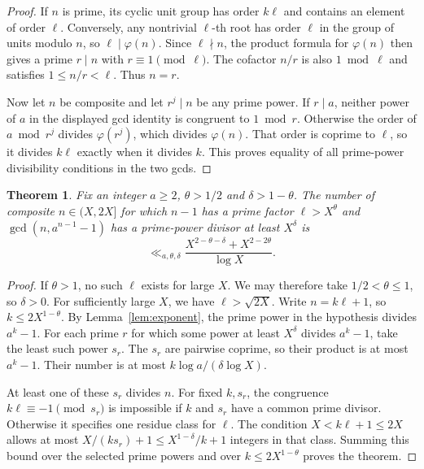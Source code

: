 \documentclass[11pt]{article}
\newtheorem{theorem}{Theorem}[section]
\begin{document}
\begin{proof}
If \(n\) is prime, its cyclic unit group has order \(k\ell\) and
contains an element of order \(\ell\). Conversely, any nontrivial
\(\ell\)-th root has order \(\ell\) in the group of units modulo
\(n\), so \(\ell\mid\varphi(n)\). Since \(\ell\nmid n\), the
product formula for \(\varphi(n)\) then gives a prime \(r\mid n\)
with \(r\equiv1\pmod\ell\). The cofactor \(n/r\) is also \(1\bmod
\ell\) and satisfies \(1\le n/r<\ell\). Thus \(n=r\).

Now let \(n\) be composite and let \(r^j\mid n\) be any prime
power. If \(r\mid a\), neither power of \(a\) in the displayed
gcd identity is congruent to \(1\bmod r\). Otherwise the order
of \(a\bmod r^j\) divides \(\varphi(r^j)\), which divides
\(\varphi(n)\). That order is coprime to \(\ell\), so it divides
\(k\ell\) exactly when it divides \(k\). This proves equality
of all prime-power divisibility conditions in the two gcds.
\end{proof}

\begin{theorem}\label{thm:joint}
Fix an integer \(a\ge2\), \(\theta>1/2\) and \(\delta>1-\theta\).
The number of composite \(n\in(X,2X]\) for which \(n-1\) has a
prime factor \(\ell>X^\theta\) and \(\gcd(n,a^{n-1}-1)\) has a
prime-power divisor at least \(X^\delta\) is
\[
  \ll_{a,\theta,\delta}
       \frac{X^{2-\theta-\delta}+X^{2-2\theta}}{\log X}.
\]
\end{theorem}

\begin{proof}
If \(\theta>1\), no such \(\ell\) exists for large \(X\). We may
therefore take \(1/2<\theta\le1\), so \(\delta>0\).
For sufficiently large \(X\), we have \(\ell>\sqrt{2X}\).
Write \(n=k\ell+1\), so \(k\le2X^{1-\theta}\). By
Lemma~\ref{lem:exponent}, the prime power in the hypothesis divides
\(a^k-1\). For each prime \(r\) for which some power at least
\(X^\delta\) divides \(a^k-1\), take the least such power \(s_r\).
The \(s_r\) are pairwise coprime, so their product is at most
\(a^k-1\). Their number is at most \(k\log a/(\delta\log X)\).

At least one of these \(s_r\) divides \(n\). For fixed \(k,s_r\),
the congruence \(k\ell\equiv-1\pmod{s_r}\) is impossible if
\(k\) and \(s_r\) have a common prime divisor. Otherwise it specifies
one residue class for \(\ell\). The condition \(X<k\ell+1\le2X\)
allows at most \(X/(k s_r)+1\le X^{1-\delta}/k+1\) integers
in that class. Summing this bound over the selected prime powers
and over \(k\le2X^{1-\theta}\) proves the theorem.
\end{proof}
\end{document}
